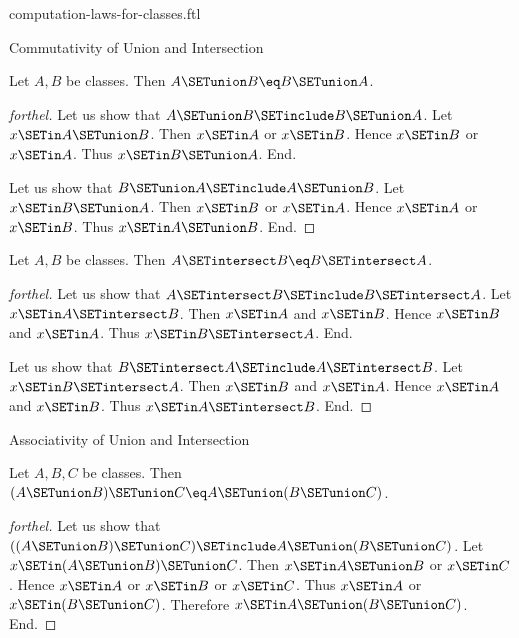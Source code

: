 \documentclass{naproche-library}
\begin{document}
\begin{smodule}[title=Computation Laws For Classes]{computation-laws-for-classes.ftl}

\begin{sfragment}{Commutativity of Union and Intersection}
  \begin{proposition}[forthel,id=FOUNDATIONS_02_8446177632583680]
    Let $A, B$ be classes.
    Then $A \SETunion B \eq B \SETunion A$.
  \end{proposition}
  \begin{proof}[forthel]
    Let us show that $A \SETunion B \SETinclude B \SETunion A$.
      Let $x \SETin A \SETunion B$.
      Then $x \SETin A$ or $x \SETin B$.
      Hence $x \SETin B$ or $x \SETin A$.
      Thus $x \SETin B \SETunion A$.
    End.

    Let us show that $B \SETunion A \SETinclude A \SETunion B$.
      Let $x \SETin B \SETunion A$.
      Then $x \SETin B$ or $x \SETin A$.
      Hence $x \SETin A$ or $x \SETin B$.
      Thus $x \SETin A \SETunion B$.
    End.
  \end{proof}

  \begin{proposition}[forthel,id=FOUNDATIONS_02_7565102251245568]
    Let $A, B$ be classes.
    Then $A \SETintersect B \eq B \SETintersect A$.
  \end{proposition}
  \begin{proof}[forthel]
    Let us show that $A \SETintersect B \SETinclude B \SETintersect A$.
      Let $x \SETin A \SETintersect B$.
      Then $x \SETin A$ and $x \SETin B$.
      Hence $x \SETin B$ and $x \SETin A$.
      Thus $x \SETin B \SETintersect A$.
    End.

    Let us show that $B \SETintersect A \SETinclude A \SETintersect B$.
      Let $x \SETin B \SETintersect A$.
      Then $x \SETin B$ and $x \SETin A$.
      Hence $x \SETin A$ and $x \SETin B$.
      Thus $x \SETin A \SETintersect B$.
    End.
  \end{proof}
\end{sfragment}

\begin{sfragment}{Associativity of Union and Intersection}
  \begin{proposition}[forthel,id=FOUNDATIONS_02_3854032263184384]
    Let $A, B, C$ be classes.
    Then $(A \SETunion B) \SETunion C \eq A \SETunion (B \SETunion C)$.
  \end{proposition}
  \begin{proof}[forthel]
    Let us show that $((A \SETunion B) \SETunion C) \SETinclude A \SETunion (B \SETunion C)$. %
      Let $x \SETin (A \SETunion B) \SETunion C$.
      Then $x \SETin A \SETunion B$ or $x \SETin C$.
      Hence $x \SETin A$ or $x \SETin B$ or $x \SETin C$.
      Thus $x \SETin A$ or $x \SETin (B \SETunion C)$.
      Therefore $x \SETin A \SETunion (B \SETunion C)$.
    End.


\end{proof}
\end{sfragment}
\end{smodule}
\end{document}
